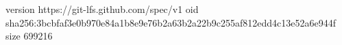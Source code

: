 version https://git-lfs.github.com/spec/v1
oid sha256:3bcbfaf3e0b970e84a1b8e9e76b2a63b2a22b9c255af812edd4c13e52a6e944f
size 699216
